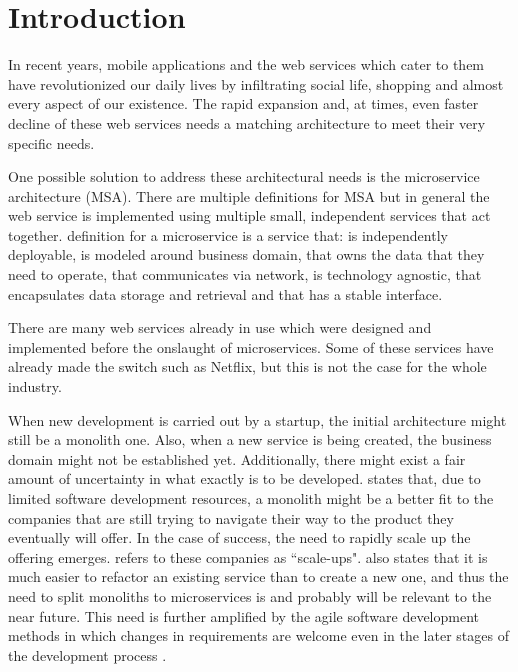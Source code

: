 

\section{Introduction}
\begin{sloppypar}
    In recent years, mobile applications and the web services which cater to
    them have revolutionized our daily lives by infiltrating social life,
    shopping and almost every aspect of our existence. The rapid expansion and,
    at times, even faster decline of these web services needs a matching
    architecture to meet their very specific needs.
\end{sloppypar}
\begin{sloppypar} One possible solution to address these architectural needs
     is the microservice architecture (MSA). There are multiple definitions for
     MSA but in general the web service is implemented using multiple small,
     independent services that act together.
     \citet{newman2019} definition for a microservice is a service that: is
     independently deployable, is modeled around business domain, that owns the
     data that they need to operate, that communicates via network, is
     technology agnostic, that encapsulates data storage and retrieval and that
     has a stable interface.
\end{sloppypar}
\begin{sloppypar}
    There are many web services already in use which were designed and
    implemented before the onslaught of microservices. Some of these services
    have already made the switch such as Netflix, but this is not the case for
    the whole industry.
\end{sloppypar}
\begin{sloppypar}
    When new development is carried out by a startup, the initial architecture
    might still be a monolith one. Also, when a new service is being created,
    the business domain might not be established yet. Additionally, there might
    exist a fair amount of uncertainty in what exactly is to be developed.
    \citet{newman2019} states that, due to limited software development
    resources, a monolith might be a better fit to the companies that are still
    trying to navigate their way to the product they eventually will offer. In
    the case of success, the need to rapidly scale up the offering emerges.
    \citet{newman2019} refers to these companies as ``scale-ups".
    \citet{newman2019} also states that it is much easier to refactor an
    existing service than to create a new one, and thus the need to split
    monoliths to microservices is and probably will be relevant to the near
    future. This need is further amplified by the agile software development
    methods in which changes in requirements are welcome even in the later
    stages of the development process \citep{agilemanifesto}.
\end{sloppypar}
